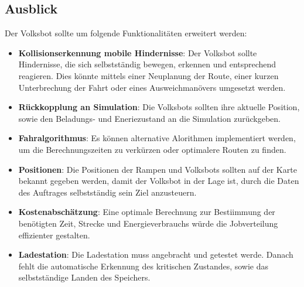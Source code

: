 \subsection{Ausblick}

Der Volksbot sollte um folgende Funktionalitäten erweitert werden:

\begin{itemize}

\item \textbf{Kollisionserkennung mobile Hindernisse}: Der Volksbot sollte Hindernisse, die sich selbstständig bewegen, erkennen und entsprechend reagieren. Dies könnte mittels einer Neuplanung der Route, einer kurzen Unterbrechung der Fahrt oder eines Ausweichmanövers umgesetzt werden. 

\item \textbf{Rückkopplung an Simulation}: Die Volksbots sollten ihre aktuelle Position, sowie den Beladungs- und Eneriezustand an die Simulation zurückgeben.

\item \textbf{Fahralgorithmus}: Es können alternative Alorithmen implementiert werden, um die Berechnungszeiten zu verkürzen oder optimalere Routen zu finden. 

\item \textbf{Positionen}: Die Positionen der Rampen und Volksbots sollten auf der Karte bekannt gegeben werden, damit der Volksbot in der Lage ist, durch die Daten des Auftrages selbstständig sein Ziel anzusteuern.

\item \textbf{Kostenabschätzung}: Eine optimale Berechnung zur Bestiimmung der benötigten Zeit, Strecke und Energieverbrauchs würde die Jobverteilung effizienter gestalten.

\item \textbf{Ladestation}: Die Ladestation muss angebracht und getestet werde. Danach fehlt die automatische Erkennung des kritischen Zustandes, sowie das selbstständige Landen des Speichers.

\end{itemize}



